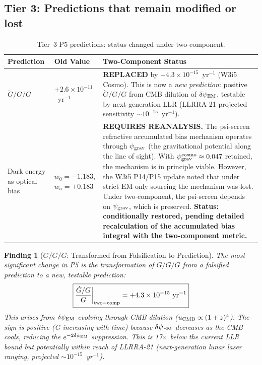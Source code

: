 \documentclass[11pt]{article}
\newtheorem{finding}{Finding}
\newcommand{\ee}[1]{\times 10^{#1}}
\newcommand{\psigrav}{\psi_{\rm grav}}
\newcommand{\dpsiEM}{\delta\psi_{\rm EM}}
\newcommand{\Gdot}{\dot{G}/G}
\begin{document}
\subsection{Tier 3: Predictions that remain modified or lost}

\begin{table}[H]
\centering
\caption{Tier~3 P5 predictions: status changed under two-component.}
\label{tab:P5-tier3}
\begin{tabular}{p{3.5cm}p{2.5cm}p{6cm}}
\toprule
\textbf{Prediction} & \textbf{Old Value} & \textbf{Two-Component Status} \\
\midrule
$\Gdot/G$ & $+2.6\ee{-11}$~yr$^{-1}$ &
  \textbf{REPLACED} by $+4.3\ee{-15}$~yr$^{-1}$ (W3i5 Cosmo).
  This is now a \emph{new prediction}: positive $\Gdot/G$ from CMB
  dilution of $\dpsiEM$, testable by next-generation LLR
  (LLRRA-21 projected sensitivity $\sim 10^{-15}$~yr$^{-1}$). \\[4pt]
Dark energy as optical bias & $w_0 = -1.183$, $w_a = +0.183$ &
  \textbf{REQUIRES REANALYSIS.} The psi-screen refractive accumulated
  bias mechanism operates through $\psigrav$ (the gravitational potential
  along the line of sight). With $\psigrav^{\rm cosmo} \approx 0.047$
  retained, the mechanism is in principle viable. However, the W3i5
  P14/P15 update noted that under strict EM-only sourcing the mechanism
  was lost. Under two-component, the psi-screen depends on $\psigrav$,
  which is preserved. \textbf{Status: conditionally restored, pending
  detailed recalculation of the accumulated bias integral with the
  two-component metric.} \\
\bottomrule
\end{tabular}
\end{table}

\begin{finding}[$\Gdot/G$: Transformed from Falsification to Prediction]
\label{find:Gdot-prediction}
The most significant change in P5 is the transformation of $\Gdot/G$ from
a falsified prediction to a \emph{new, testable prediction}:
\begin{equation}
\boxed{\frac{\Gdot}{G}\bigg|_{\rm two-comp} = +4.3\ee{-15}~\text{yr}^{-1}}
\end{equation}
This arises from $\dpsiEM$ evolving through CMB dilution ($u_{\rm CMB}
\propto (1+z)^4$). The sign is positive (G increasing with time) because
$\dpsiEM$ decreases as the CMB cools, reducing the $e^{-2\dpsiEM}$ suppression.
This is 17$\times$ below the current LLR bound but potentially within
reach of LLRRA-21 (next-generation lunar laser ranging, projected
$\sim 10^{-15}$~yr$^{-1}$).
\end{finding}
\end{document}
